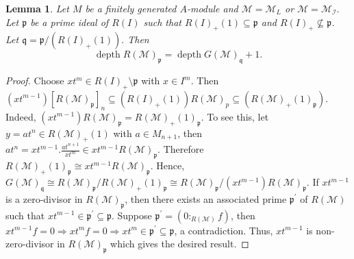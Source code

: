 \documentclass[11pt,reqno]{amsart}
\newtheorem{lemma}[theorem]{Lemma}
\theoremstyle{definition}
\newcommand{\p}{\mathfrak p}
\newcommand{\q}{\mathfrak q}
\def\R{{\mathcal R}}
\def\M{{\mathcal M}}
\def\I{{\mathcal I}}
\DeclareMathOperator{\depth}{depth}
\numberwithin{equation}{section}
\begin{document}
	\begin{lemma}\label{Appendix-Lemma-1}
		Let $M$ be a finitely generated $A$-module and $\M=\M_L$ or $\M=\M_\I.$ 
		Let $\p$ be a prime ideal of $R(I)$ such that $R(I)_+(1)\subseteq \p$ and $R(I)_+\nsubseteq \p$. Let $\q=\p/(R(I)_+(1)).$ Then 
		$$\depth R(\M)_{\p}=\depth G(\mathcal{M})_{\q}+1.$$ 
	\end{lemma}
	\begin{proof}
		Choose $xt^{m}\in R(I)_+\setminus \p$ with $x\in I^{m}$. Then  $(xt^{m-1})[R(\M)_{\p}]_n\subseteq (R(I)_+(1)) R(\M)_p\subseteq (R(\M)_+(1)_{\p}).$ 
  Indeed, $(xt^{m-1})R(\M)_{\p}=R(\M)_+(1)_{\p}.$ To see this, let $y=at^n\in R(\M)_+(1)$ with $a\in M_{n+1}$, then 
		$at^n=xt^{m-1}.\frac{at^{n+1}}{xt^m}\in xt^{m-1}R(\M)_{\p}$. Therefore  $R(\M)_+(1)_{\p}\cong xt^{m-1}R(\M)_{\p}$. Hence, $G(\M)_{\q}\cong R(\M)_{\p}/R(\M)_+(1)_{\p}\cong R(\M)_{\p}/(xt^{m-1})R(\M)_{\p}.$
		If $xt^{m-1}$ is a zero-divisor in  $R(\M)_{\p}$, then there exists an associated prime ${\p}^\prime$ of $R(\M)$ such that $xt^{m-1}\in {\p}^\prime\subseteq \p$.  Suppose ${\p}^\prime=(0:_{R(\M)} f)$, then $xt^{m-1}f=0\Rightarrow xt^{m}f=0\Rightarrow xt^m\in {\p}^\prime\subseteq 
		\p$, a contradiction. Thus, $xt^{m-1}$ is non-zero-divisor in 
		$R(\M)_{\p}$ which gives the desired result.
	\end{proof}
     
\end{document}
